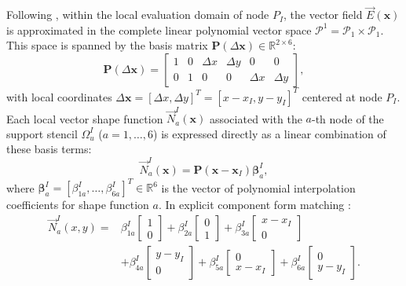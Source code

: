 \documentclass[VANCOUVER,Times1COL]{WileyNJD-v5}
\begin{document}
Following \cite{stable_vnmm2d_2026}, within the local evaluation domain of node $P_I$, the vector field $\vec{E}(\mathbf{x})$ is approximated in the complete linear polynomial vector space $\mathcal{P}^1 = \mathcal{P}_1 \times \mathcal{P}_1$. This space is spanned by the basis matrix $\mathbf{P}(\Delta\mathbf{x}) \in \mathbb{R}^{2 \times 6}$:
\begin{equation}
    \mathbf{P}(\Delta\mathbf{x}) = \begin{bmatrix}
        1 & 0 & \Delta x & \Delta y & 0        & 0        \\
        0 & 1 & 0        & 0        & \Delta x & \Delta y
    \end{bmatrix},
    \label{eq:P_basis_matrix}
\end{equation}
with local coordinates $\Delta\mathbf{x} = [\Delta x, \Delta y]^T = [x - x_I, y - y_I]^T$ centered at node $P_I$.
Each local vector shape function $\vec{N}_a^I(\mathbf{x})$ associated with the $a$-th node of the support stencil $\Omega_u^I$ ($a = 1, \dots, 6$) is expressed directly as a linear combination of these basis terms:
\begin{equation}
    \vec{N}_a^I(\mathbf{x}) = \mathbf{P}(\mathbf{x} - \mathbf{x}_I) \boldsymbol{\beta}_a^I,
    \label{eq:shape_functions}
\end{equation}
where $\boldsymbol{\beta}_a^I = [\beta_{1a}^I, \dots, \beta_{6a}^I]^T \in \mathbb{R}^6$ is the vector of polynomial interpolation coefficients for shape function $a$. In explicit component form matching \cite{stable_vnmm2d_2026}:
\begin{equation}
    \begin{aligned}
        \vec{N}_a^I(x, y) = & \beta_{1a}^I \begin{bmatrix} 1 \\ 0 \end{bmatrix} + \beta_{2a}^I \begin{bmatrix} 0 \\ 1 \end{bmatrix} + \beta_{3a}^I \begin{bmatrix} x - x_I \\ 0 \end{bmatrix}                \\
                            & + \beta_{4a}^I \begin{bmatrix} y - y_I \\ 0 \end{bmatrix} + \beta_{5a}^I \begin{bmatrix} 0 \\ x - x_I \end{bmatrix} + \beta_{6a}^I \begin{bmatrix} 0 \\ y - y_I \end{bmatrix}.
    \end{aligned}
    \label{eq:P1_shape_function_expansion_mlpg}
\end{equation}
\end{document}
